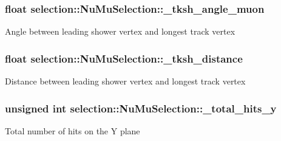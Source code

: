 \subsubsection[{\texorpdfstring{\+\_\+tksh\+\_\+angle\+\_\+muon}{_tksh_angle_muon}}]{\setlength{\rightskip}{0pt plus 5cm}float selection\+::\+Nu\+Mu\+Selection\+::\+\_\+tksh\+\_\+angle\+\_\+muon\hspace{0.3cm}{\ttfamily [private]}}\hypertarget{classselection_1_1NuMuSelection_a683d563efffdd178b3fa5eaf7e8efeb7}{}\label{classselection_1_1NuMuSelection_a683d563efffdd178b3fa5eaf7e8efeb7}
Angle between leading shower vertex and longest track vertex 
\subsubsection[{\texorpdfstring{\+\_\+tksh\+\_\+distance}{_tksh_distance}}]{\setlength{\rightskip}{0pt plus 5cm}float selection\+::\+Nu\+Mu\+Selection\+::\+\_\+tksh\+\_\+distance\hspace{0.3cm}{\ttfamily [private]}}\hypertarget{classselection_1_1NuMuSelection_a046903808fefc33bee41d19b1f6a96de}{}\label{classselection_1_1NuMuSelection_a046903808fefc33bee41d19b1f6a96de}
Distance between leading shower vertex and longest track vertex 
\subsubsection[{\texorpdfstring{\+\_\+total\+\_\+hits\+\_\+y}{_total_hits_y}}]{\setlength{\rightskip}{0pt plus 5cm}unsigned int selection\+::\+Nu\+Mu\+Selection\+::\+\_\+total\+\_\+hits\+\_\+y\hspace{0.3cm}{\ttfamily [private]}}\hypertarget{classselection_1_1NuMuSelection_a6c1ae5a457aa2734684c6632abf34a8c}{}\label{classselection_1_1NuMuSelection_a6c1ae5a457aa2734684c6632abf34a8c}
Total number of hits on the Y plane 

